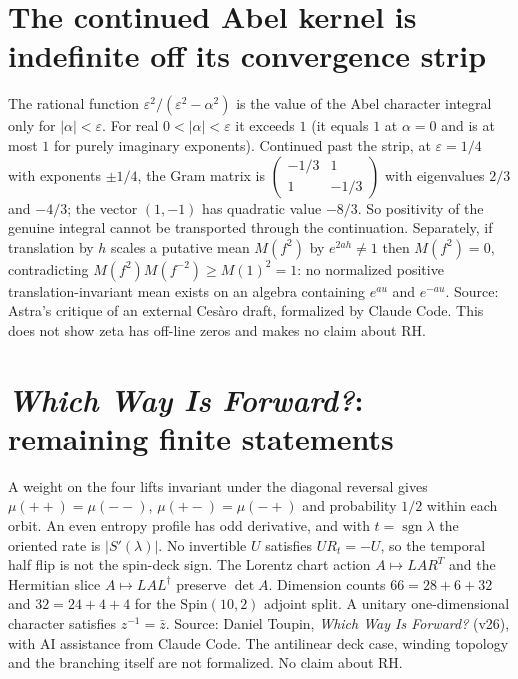 \documentclass{report}
\theoremstyle{definition}
\begin{document}
\begin{itemize}
\begin{itemize}
\section{The continued Abel kernel is indefinite off its convergence strip}
The rational function $\varepsilon^2/(\varepsilon^2-\alpha^2)$ is the value of the Abel character integral only for
$|\alpha|<\varepsilon$. For real $0<|\alpha|<\varepsilon$ it exceeds $1$ (it equals $1$ at $\alpha=0$ and is at most $1$ for
purely imaginary exponents). Continued past the strip, at $\varepsilon=1/4$ with exponents $\pm1/4$, the Gram matrix is
$\begin{pmatrix}-1/3&1\\1&-1/3\end{pmatrix}$ with eigenvalues $2/3$ and $-4/3$; the vector $(1,-1)$ has quadratic value $-8/3$.
So positivity of the genuine integral cannot be transported through the continuation. Separately, if translation by $h$ scales a
putative mean $M(f^2)$ by $e^{2ah}\ne1$ then $M(f^2)=0$, contradicting $M(f^2)M(f^{-2})\ge M(1)^2=1$: no normalized positive
translation-invariant mean exists on an algebra containing $e^{au}$ and $e^{-au}$. Source: Astra's critique of an external
Ces\`aro draft, formalized by Claude Code. This does not show zeta has off-line zeros and makes no claim about RH.

\section{\emph{Which Way Is Forward?}: remaining finite statements}
A weight on the four lifts invariant under the diagonal reversal gives $\mu(++)=\mu(--)$, $\mu(+-)=\mu(-+)$ and probability $1/2$ within
each orbit. An even entropy profile has odd derivative, and with $t=\operatorname{sgn}\lambda$ the oriented rate is $|S'(\lambda)|$. No
invertible $U$ satisfies $UR_t=-U$, so the temporal half flip is not the spin-deck sign. The Lorentz chart action $A\mapsto LAR^T$ and the
Hermitian slice $A\mapsto LAL^\dagger$ preserve $\det A$. Dimension counts $66=28+6+32$ and $32=24+4+4$ for the $\mathrm{Spin}(10,2)$
adjoint split. A unitary one-dimensional character satisfies $z^{-1}=\bar z$. Source: Daniel Toupin, \emph{Which Way Is Forward?} (v26),
with AI assistance from Claude Code. The antilinear deck case, winding topology and the branching itself are not formalized. No claim about RH.

\end{itemize}
\end{itemize}
\end{document}
